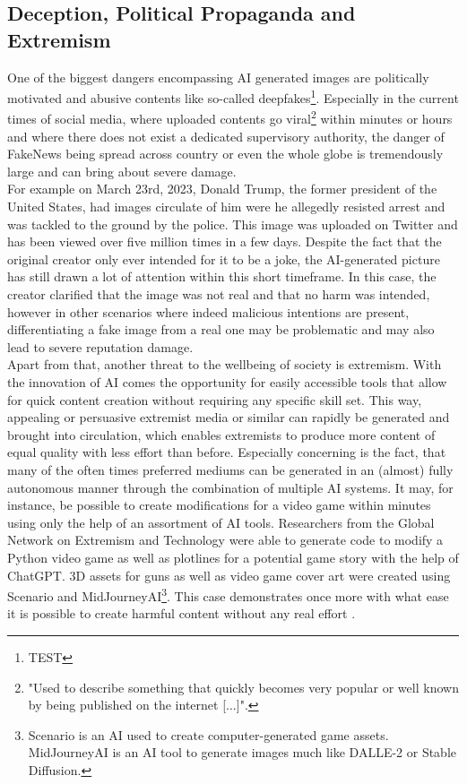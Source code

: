 \documentclass[10pt,twocolumn,twoside]{osajnl}
\begin{document}
\subsection{Deception, Political Propaganda and Extremism}
One of the biggest dangers encompassing AI generated images are politically motivated and abusive contents like so-called deepfakes\footnote[1]{TEST}. 
Especially in the current times of social media, where uploaded contents go viral\footnote[2]{"Used to describe something that quickly becomes very popular or well known by being published on the internet [...]"\cite{viral}.} 
within minutes or hours and where there does not exist a dedicated supervisory authority, the danger of FakeNews being spread across country or even the whole globe is tremendously large and can bring about severe damage. \\ 
For example on March 23rd, 2023, Donald Trump, the former president of the United States, had images circulate of him 
were he allegedly resisted arrest and was tackled to the ground by the police. This image was uploaded on Twitter and has been viewed over five million times in a few days. Despite the fact that the original creator 
only ever intended for it to be a joke, the AI-generated picture has still drawn a lot of attention within this short timeframe\cite{trump}. In this case, the creator clarified that the image 
was not real and that no harm was intended, however in other scenarios where indeed malicious intentions are present, differentiating a fake image from a real one may be problematic and may also lead to severe reputation damage.
\\
Apart from that, another threat to the wellbeing of society is extremism. With the innovation of AI comes the opportunity for easily accessible tools that allow
for quick content creation without requiring any specific skill set. This way, appealing or persuasive extremist media or similar can rapidly be generated
and brought into circulation, which enables extremists to produce more content of equal quality with less effort than before\cite{AIPropaganda}.
Especially concerning is the fact, that many of the often times preferred mediums can be generated in an (almost) fully autonomous manner through the combination of multiple AI systems.
It may, for instance, be possible to create modifications for a video game within minutes using only the help of an assortment of AI tools.
Researchers from the Global Network on Extremism and Technology were able to generate code to modify a Python video game as well as plotlines for a potential game story with the help of ChatGPT. 
3D assets for guns as well as video game cover art were created using Scenario and MidJourneyAI\footnote[4]{Scenario is an AI used to create computer-generated game assets. MidJourneyAI
is an AI tool to generate images much like DALLE-2 or Stable Diffusion.}. This case demonstrates once more with what ease it is possible to create harmful content without any real effort \cite{AIPropaganda}. 
\end{document}
